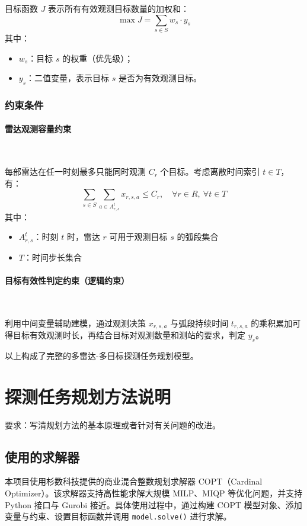 \documentclass[openany,12pt,UTF8]{ctexart}
\begin{document}
目标函数 $J$ 表示所有有效观测目标数量的加权和：
$$
    \max J = \sum_{s \in S} w_s \cdot y_s
$$
其中：
\begin{itemize}
    \item $w_s$：目标 $s$ 的权重（优先级）；
    \item $y_s$：二值变量，表示目标 $s$ 是否为有效观测目标。
\end{itemize}

\subsubsection{约束条件}

\paragraph{雷达观测容量约束}\

每部雷达在任一时刻最多只能同时观测 $C_r$ 个目标。考虑离散时间索引 $t \in T$，有：
$$
    \sum_{s \in S} \sum_{a \in A_{r,s}^t} x_{r,s,a} \leq C_r, \quad \forall r \in R,\ \forall t \in T
$$
其中：
\begin{itemize}
    \item $A_{r,s}^t$：时刻 $t$ 时，雷达 $r$ 可用于观测目标 $s$ 的弧段集合
    \item $T$：时间步长集合
\end{itemize}

\paragraph{目标有效性判定约束（逻辑约束）}\

利用中间变量辅助建模，通过观测决策 $x_{r,s,a}$ 与弧段持续时间 $t_{r,s,a}$ 的乘积累加可得目标有效观测时长，再结合目标对观测数量和测站的要求，判定 $y_s$。

以上构成了完整的多雷达-多目标探测任务规划模型。

\section{探测任务规划方法说明}
要求：写清规划方法的基本原理或者针对有关问题的改进。
\subsection{使用的求解器}
本项目使用杉数科技提供的商业混合整数规划求解器 COPT（Cardinal Optimizer）。该求解器支持高性能求解大规模 MILP、MIQP 等优化问题，并支持 Python 接口与 Gurobi 接近。具体使用过程中，通过构建 COPT 模型对象、添加变量与约束、设置目标函数并调用 \texttt{model.solve()} 进行求解。
\end{document}
